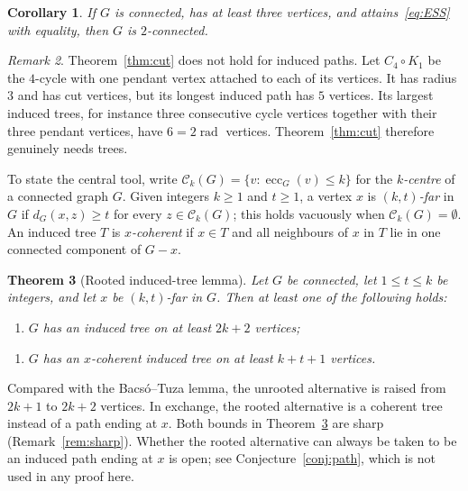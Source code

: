 \documentclass[11pt,a4paper]{article}
\newtheorem{theorem}{Theorem}[section]
\newtheorem{corollary}[theorem]{Corollary}
\theoremstyle{remark}
\newtheorem{remark}[theorem]{Remark}
\newcommand{\rad}{\operatorname{rad}}
\newcommand{\ecc}{\operatorname{ecc}}
\newcommand{\C}{\mathcal C}
\begin{document}
\begin{corollary}\label{cor:2conn}
If $G$ is connected, has at least three vertices, and attains~\eqref{eq:ESS} with equality, then $G$ is $2$-connected.
\end{corollary}

\begin{remark}\label{rem:nopath}
Theorem~\ref{thm:cut} does not hold for induced paths. Let $C_4\circ K_1$ be the $4$-cycle with one pendant vertex attached to each of its vertices. It has radius $3$ and has cut vertices, but its longest induced path has $5$ vertices. Its largest induced trees, for instance three consecutive cycle vertices together with their three pendant vertices, have $6=2\rad$ vertices. Theorem~\ref{thm:cut} therefore genuinely needs trees.
\end{remark}

To state the central tool, write $\C_k(G)=\{v:\ecc_G(v)\le k\}$ for the \emph{$k$-centre} of a connected graph $G$. Given integers $k\ge1$ and $t\ge1$, a vertex $x$ is \emph{$(k,t)$-far} in $G$ if $d_G(x,z)\ge t$ for every $z\in\C_k(G)$; this holds vacuously when $\C_k(G)=\emptyset$. An induced tree $T$ is \emph{$x$-coherent} if $x\in T$ and all neighbours of $x$ in $T$ lie in one connected component of $G-x$.

\begin{theorem}[Rooted induced-tree lemma]\label{thm:rooted}
Let $G$ be connected, let $1\le t\le k$ be integers, and let $x$ be $(k,t)$-far in $G$. Then at least one of the following holds:
\begin{enumerate}[label=\textup{(T)},leftmargin=3em]
\item $G$ has an induced tree on at least $2k+2$ vertices;
\end{enumerate}
\begin{enumerate}[label=\textup{(R)},leftmargin=3em]
\item $G$ has an $x$-coherent induced tree on at least $k+t+1$ vertices.
\end{enumerate}
\end{theorem}

Compared with the Bacs\'o--Tuza lemma, the unrooted alternative is raised from $2k+1$ to $2k+2$ vertices. In exchange, the rooted alternative is a coherent tree instead of a path ending at $x$. Both bounds in Theorem~\ref{thm:rooted} are sharp (Remark~\ref{rem:sharp}). Whether the rooted alternative can always be taken to be an induced path ending at $x$ is open; see Conjecture~\ref{conj:path}, which is not used in any proof here.
\end{document}
